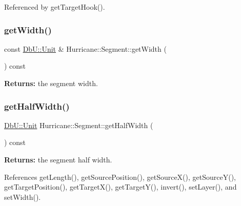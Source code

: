 Referenced by get\+Target\+Hook().

\mbox{\label{classHurricane_1_1Segment_a36c7ddda39077385bd8747a8c1df726a}} 
\subsubsection{\texorpdfstring{get\+Width()}{getWidth()}}
{\footnotesize\ttfamily const \hyperlink{group__DbUGroup_ga4fbfa3e8c89347af76c9628ea06c4146}{Db\+U\+::\+Unit} \& Hurricane\+::\+Segment\+::get\+Width (\begin{DoxyParamCaption}{ }\end{DoxyParamCaption}) const\hspace{0.3cm}{\ttfamily [inline]}}

{\bfseries Returns\+:} the segment width. \mbox{\label{classHurricane_1_1Segment_a58e4abcf545ad5c89ca2854a2b4471f8}} 
\subsubsection{\texorpdfstring{get\+Half\+Width()}{getHalfWidth()}}
{\footnotesize\ttfamily \hyperlink{group__DbUGroup_ga4fbfa3e8c89347af76c9628ea06c4146}{Db\+U\+::\+Unit} Hurricane\+::\+Segment\+::get\+Half\+Width (\begin{DoxyParamCaption}{ }\end{DoxyParamCaption}) const\hspace{0.3cm}{\ttfamily [inline]}}

{\bfseries Returns\+:} the segment half width. 

References get\+Length(), get\+Source\+Position(), get\+Source\+X(), get\+Source\+Y(), get\+Target\+Position(), get\+Target\+X(), get\+Target\+Y(), invert(), set\+Layer(), and set\+Width().

\mbox{\label{classHurricane_1_1Segment_a0347e3bde8e2e90b05cffdaf2d048710}} 
